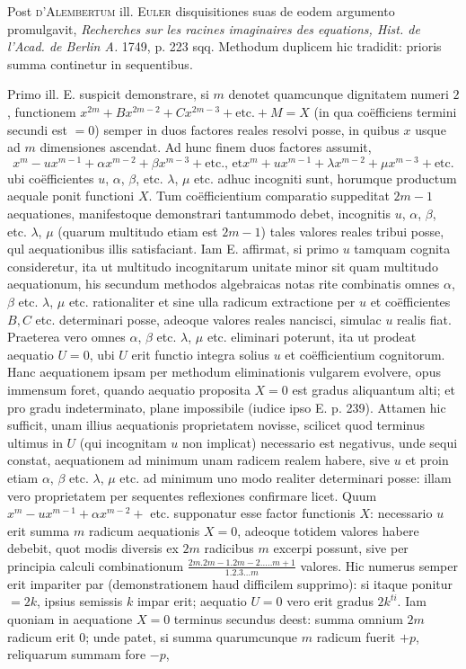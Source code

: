 \documentclass[14pt]{memoir}
\theoremstyle{plain}
\theoremstyle{remark}
\begin{document}
Post \textsc{d'Alembertum} ill. \textsc{Euler} disquisitiones suas de eodem argumento promulgavit, \textit{Recherches sur les racines imaginaires des equations, Hist. de l'Acad. de Berlin A.} 1749, p. 223 sqq. Methodum duplicem hic tradidit: prioris summa continetur in sequentibus.

Primo ill. \textsc{E.} suspicit demonstrare, si \(m\) denotet quamcunque dignitatem numeri \(2\), functionem \(x^{2m} + Bx^{2m-2} + C x^{2m-3} + \text{etc.} + M = X\) (in qua co\"efficiens termini secundi est \(= 0\)) semper in duos factores reales resolvi posse, in quibus \(x\) usque ad \(m\) dimensiones ascendat.  Ad hunc finem duos factores assumit, \[x^m - u x^{m-1} + \alpha x^{m-2} + \beta x^{m-3} + \text{etc., et} x^m + u x^{m-1}+\lambda x^{m-2} + \mu x^{m-3} + \text{etc.} \] ubi co\"efficientes \(u\), \(\alpha\), \(\beta\), etc. \(\lambda\), \(\mu\) etc. adhuc incogniti sunt, horumque productum aequale ponit functioni \(X\). Tum co\"efficientium comparatio suppeditat \(2m-1\) aequationes, manifestoque demonstrari tantummodo debet, incognitis \(u\), \(\alpha\), \(\beta\), etc. \(\lambda\), \(\mu\) (quarum multitudo etiam est \(2m -1\)) tales valores reales tribui posse, qul aequationibus illis satisfaciant. Iam \textsc{E.} affirmat, si primo \(u\) tamquam cognita consideretur, ita ut multitudo incognitarum unitate minor sit quam multitudo aequationum, his secundum methodos algebraicas notas rite combinatis omnes \(\alpha\), \(\beta\) etc. \(\lambda\), \(\mu\) etc. rationaliter et sine ulla radicum extractione per \(u\) et co\"efficientes \(B, C\) etc. determinari posse, adeoque valores reales nancisci, simulac \(u\) realis fiat. Praeterea vero omnes \(\alpha\), \(\beta\) etc. \(\lambda\), \(\mu\) etc. eliminari poterunt, ita ut prodeat aequatio \(U = 0\), ubi \(U\) erit functio integra solius \(u\) et co\"efficientium cognitorum. Hanc aequationem ipsam per methodum eliminationis vulgarem evolvere, opus immensum foret, quando aequatio proposita \(X = 0\)  est gradus aliquantum alti; et pro gradu indeterminato, plane impossibile (iudice ipso \textsc{E.} p. 239). Attamen hic sufficit, unam illius aequationis proprietatem novisse, scilicet quod terminus ultimus in \(U\) (qui incognitam \(u\) non implicat) necessario est negativus, unde sequi constat, aequationem ad minimum unam radicem realem habere, sive \(u\) et proin etiam  \(\alpha\), \(\beta\) etc. \(\lambda\), \(\mu\) etc. ad minimum uno modo realiter determinari posse: illam vero proprietatem per sequentes reflexiones confirmare licet.  Quum \(x^m - u x^{m-1}+\alpha x^{m-2} +\) etc. supponatur esse factor functionis \(X\):  necessario \(u\) erit summa \(m\) radicum aequationis \(X = 0\), adeoque totidem valores habere debebit, quot modis diversis ex \(2m\) radicibus \(m\) excerpi possunt, sive per principia calculi combinationum \(\frac{2m . 2m-1 . 2m-2 . \dots . m+1}{1.2.3 \dots m}\) valores.   Hic numerus semper erit impariter par (demonstrationem haud difficilem supprimo): si itaque ponitur \(= 2k\), ipsius semissis \(k\) impar erit; aequatio \(U= 0\) vero erit gradus \(2k^{ti}\). Iam quoniam in aequatione \(X= 0\) terminus secundus deest: summa omnium \(2m\) radicum erit \(0\); unde patet, si summa quarumcunque \(m\) radicum fuerit \(+p\), reliquarum summam fore \(-p\), 
\end{document}
